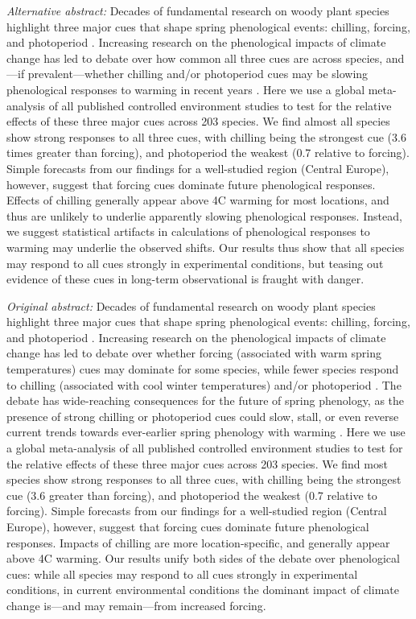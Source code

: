 \documentclass{article}
\begin{document}
\emph{Alternative abstract:} Decades of fundamental research on woody plant species highlight three major cues that shape spring phenological events: chilling, forcing, and photoperiod \citep[e.g.,][]{Campbell:1975aa,Heide:2008aa,flynn2018}. Increasing research on the phenological impacts of climate change has led to debate over how common all three cues are across species, and---if prevalent---whether chilling and/or photoperiod cues may be slowing phenological responses to warming in recent years \citep{Heide:2011aa,koerner2010b,fu2015,zohner2016}. Here we use a global meta-analysis of all published controlled environment studies to test for the relative effects of these three major cues across 203 species. We find almost all species show strong responses to all three cues, with chilling being the strongest cue (3.6 times greater than forcing), and photoperiod the weakest (0.7 relative to forcing). Simple forecasts from our findings for a well-studied region (Central Europe), however, suggest that forcing cues dominate future phenological responses. Effects of chilling generally appear above 4\degree C warming for most locations, and thus are unlikely to underlie apparently slowing phenological responses. Instead, we suggest statistical artifacts in calculations of phenological responses to warming may underlie the observed shifts. Our results thus show that all species may respond to all cues strongly in experimental conditions, but teasing out evidence of these cues in long-term observational is fraught with danger.

\emph{Original abstract:} Decades of fundamental research on woody plant species highlight three major cues that shape spring phenological events: chilling, forcing, and photoperiod \citep[e.g.,][]{Campbell:1975aa,Heide:2008aa,flynn2018}. Increasing research on the phenological impacts of climate change has led to debate over whether forcing (associated with warm spring temperatures) cues may dominate for some species, while fewer species
respond to chilling (associated with cool winter temperatures) and/or photoperiod \citep{Heide:2011aa,koerner2010b,zohner2016}. The debate has wide-reaching consequences for the future of spring phenology, as the presence of strong chilling or photoperiod cues could slow, stall, or even reverse current trends towards ever-earlier spring phenology with warming \citep{fu2015,koerner2010a}. Here we use a global meta-analysis of all published controlled environment studies to test for the relative effects of these three major cues across 203 species. We find most species show strong responses to all three cues, with chilling being the strongest cue (3.6 greater than forcing), and photoperiod the weakest (0.7 relative to forcing). Simple forecasts from our findings for a well-studied region (Central Europe), however, suggest that forcing cues dominate future phenological responses. Impacts of chilling are more location-specific, and generally appear above 4\degree C warming. Our results unify both sides of the debate over phenological cues: while all species may respond to all cues strongly in experimental conditions, in current environmental conditions the dominant impact of climate change is---and may remain---from increased forcing. 
\end{document}
